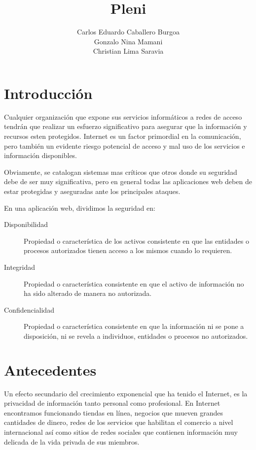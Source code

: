 \documentclass[letter,twoside,11pt]{article}
\title{\bf Pleni}
\author{
    Carlos Eduardo Caballero Burgoa \\
    Gonzalo Nina Mamani \\
    Christian Lima Saravia \\
}
\newcommand{\blankpage}{
\newpage
\thispagestyle{empty}
\mbox{}
\newpage
}
\begin{document}
\maketitle

\blankpage
\tableofcontents
\blankpage

\section{Introducción}
Cualquier organización que expone sus servicios informáticos a redes de acceso
tendrán que realizar un esfuerzo significativo para asegurar que la información
y recursos esten protegidos. Internet es un factor primordial en la
comunicación, pero también un evidente riesgo potencial de acceso y mal uso de
los servicios e información disponibles.

Obviamente, se catalogan sistemas mas críticos que otros donde su seguridad debe
de ser muy significativa, pero en general todas las aplicaciones web deben de
estar protegidas y aseguradas ante los principales ataques.

En una aplicación web, dividimos la seguridad en:

\begin{description}
    \item [Disponibilidad] Propiedad o característica de los activos consistente
        en que las entidades o procesos autorizados tienen acceso a los mismos
        cuando lo requieren.
    \item [Integridad] Propiedad o característica consistente en que el activo
        de información no ha sido alterado de manera no autorizada.
    \item [Confidencialidad] Propiedad o característica consistente en que la
        información ni se pone a disposición, ni se revela a individuos,
        entidades o procesos no autorizados.
\end{description}

\section{Antecedentes}
Un efecto secundario del crecimiento exponencial que ha tenido el Internet, es
la privacidad de información tanto personal como profesional. En Internet
encontramos funcionando tiendas en línea, negocios que mueven grandes
cantidades de dinero, redes de los servicios que habilitan el comercio a nivel
internacional así como sitios de redes sociales que contienen información muy
delicada de la vida privada de sus miembros.
\end{document}
